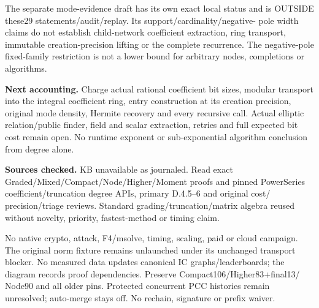 \documentclass[10pt]{article}
\begin{document}
The separate mode-evidence draft has its own exact local status and is
OUTSIDE these29 statements/audit/replay. Its support/cardinality/negative-
pole width claims do not establish child-network coefficient extraction,
ring transport, immutable creation-precision lifting or the complete
recurrence. The negative-pole fixed-family restriction is not a lower bound
for arbitrary nodes, completions or algorithms.

\textbf{Next accounting.} Charge actual rational coefficient bit sizes,
modular transport into the integral coefficient ring, entry construction at
its creation precision, original mode density, Hermite recovery and every
recursive call. Actual elliptic relation/public finder, field and scalar
extraction, retries and full expected bit cost remain open. No runtime
exponent or sub-exponential algorithm conclusion from degree alone.

\textbf{Sources checked.} KB unavailable as journaled. Read exact
Graded/Mixed/Compact/Node/Higher/Moment proofs and pinned PowerSeries
coefficient/truncation degree APIs, primary D.4.5--6 and original cost/
precision/triage reviews. Standard grading/truncation/matrix algebra reused
without novelty, priority, fastest-method or timing claim.

No native crypto, attack, F4/msolve, timing, scaling, paid or cloud campaign.
The original norm fixture remains unlaunched under its unchanged transport
blocker. No measured data updates canonical IC graphs/leaderboards; the
diagram records proof dependencies. Preserve Compact106/Higher83+final13/
Node90 and all older pins. Protected concurrent PCC histories remain
unresolved; auto-merge stays off. No rechain, signature or prefix waiver.
\end{document}
